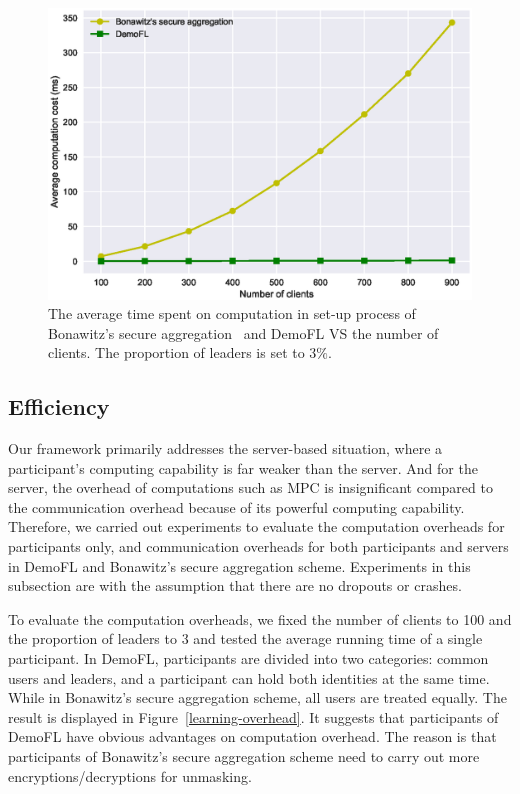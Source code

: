 \begin{figure}[!ht]
    \centering
    \includegraphics[width=\columnwidth]{img/avg-user-cpu.eps}
    \caption{The average time spent on computation in set-up process of Bonawitz's secure aggregation~\cite{Practical} and DemoFL VS the number of clients. The proportion of leaders is set to $3\%$.}
    \label{avg-user-cpu}
\end{figure}

\subsection{Efficiency}
Our framework primarily addresses the server-based situation, where a participant's computing capability is far weaker than the server. And for the server, the overhead of computations such as MPC is insignificant compared to the communication overhead because of its powerful computing capability. Therefore, we carried out experiments to evaluate the computation overheads for participants only, and communication overheads for both participants and servers in DemoFL and Bonawitz's secure aggregation scheme. Experiments in this subsection are with the assumption that there are no dropouts or crashes.

To evaluate the computation overheads, we fixed the number of clients to 100 and the proportion of leaders to $3$ and tested the average running time of a single participant. In DemoFL, participants are divided into two categories: common users and leaders, and a participant can hold both identities at the same time. While in Bonawitz's secure aggregation scheme, all users are treated equally. The result is displayed in Figure~\ref{learning-overhead}. It suggests that participants of DemoFL have obvious advantages on computation overhead. The reason is that participants of Bonawitz's secure aggregation scheme need to carry out more encryptions/decryptions for unmasking.

